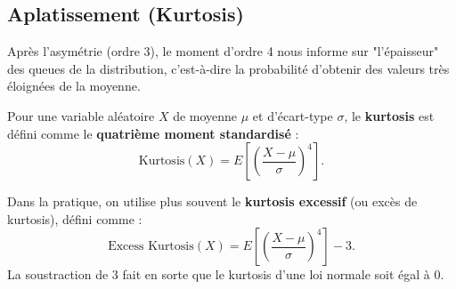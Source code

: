 \subsection{Aplatissement (Kurtosis)}

Après l'asymétrie (ordre 3), le moment d'ordre 4 nous informe sur "l'épaisseur" des queues de la distribution, c'est-à-dire la probabilité d'obtenir des valeurs très éloignées de la moyenne.

\begin{definitionbox}
Pour une variable aléatoire $X$ de moyenne $\mu$ et d'écart-type $\sigma$, le \textbf{kurtosis} est défini comme le \textbf{quatrième moment standardisé} :
$$ \text{Kurtosis}(X) = E\left[ \left( \frac{X - \mu}{\sigma} \right)^4 \right]. $$

Dans la pratique, on utilise plus souvent le \textbf{kurtosis excessif} (ou excès de kurtosis), défini comme :
$$ \text{Excess Kurtosis}(X) = E\left[ \left( \frac{X - \mu}{\sigma} \right)^4 \right] - 3. $$
La soustraction de 3 fait en sorte que le kurtosis d'une loi normale soit égal à 0.
\end{definitionbox}

